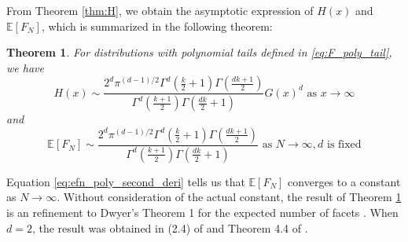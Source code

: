 \documentclass[conference,a4paper]{IEEEtran}
\def\E{\mathbb{E}}
\newtheorem{theorem}{Theorem}
\begin{document}
From Theorem \ref{thm:H}, we obtain the asymptotic
expression of $H(x)$ and $\E[F_N]$, which is
summarized in the following theorem:
\begin{theorem}\label{thm:poly_tails}
     For distributions with polynomial tails defined in \eqref{eq:F_poly_tail},
     we have
\begin{equation}\label{eq:H_poly_tail_exp}
     H(x) \sim \frac{2^d \pi^{(d-1)/2}\Gamma^d(\frac{k}{2}+1)
     \Gamma(\frac{dk+1}{2})}{
         \Gamma^d(\frac{k+1}{2}) \Gamma(\frac{dk}{2}+1)} G(x)^d 
         \textrm{ as } x\to \infty
\end{equation}
and 
\begin{equation}\label{eq:efn_poly_second_deri}
    \E[F_N] \sim \frac{2^d \pi^{(d-1)/2}\Gamma^d(\frac{k}{2}+1)
    \Gamma(\frac{dk+1}{2})}{
        \Gamma^d(\frac{k+1}{2}) \Gamma(\frac{dk}{2}+1)}
        \textrm{ as } N \to \infty, d \textrm { is fixed}
\end{equation}
\end{theorem}
Equation \eqref{eq:efn_poly_second_deri} tells
us that $\E[F_N]$ converges to a constant as $N \to \infty$.
Without consideration of the actual constant, the result of
Theorem \ref{thm:poly_tails} is an refinement to Dwyer's Theorem 1 for the expected number of facets \cite{dwyer1991convex}.
When $d=2$, the result was obtained in (2.4) of \cite{carnal1970konvexe}
and Theorem 4.4 of \cite{davis1987convex}.
\end{document}
